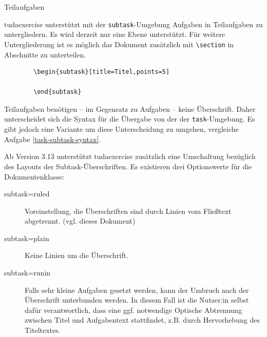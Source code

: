 \documentclass[
	ngerman,
	points=true,%
	]{tudaexercise}
\let\code\texttt
\let\cls\textsf
\let\tbs\textbackslash
\begin{document}
\begin{task}{Teilaufgaben}
\begin{subtask}[title=Grundsturktur]
	\cls{tudaexercise} unterstützt mit der \code{subtask}-Umgebung Aufgaben in Teilaufgaben zu untergliedern. Es wird derzeit nur eine Ebene unterstützt. Für weitere Untergliederung ist es möglich das Dokument zusätzlich mit \code{\tbs{}section} in Abschnitte zu unterteilen. 
	
	\begin{verbatim}
		\begin{subtask}[title=Titel,points=5]
			
		\end{subtask}
	\end{verbatim}

	Teilaufgaben benötigen – im Gegensatz zu Aufgaben – keine Überschrift. Daher unterscheidet sich die Syntax für die Übergabe von der der \code{task}-Umgebung. Es gibt jedoch eine Variante um diese Unterscheidung zu umgehen, vergleiche Aufgabe \ref{task-subtask-syntax}.
\end{subtask}

\begin{subtask}[title=Anpassung der Überschriften]
	Ab Version 3.13 unterstützt \cls{tudaexercise} zusätzlich eine Umschaltung bezüglich des Layouts der Subtask-Überschriften. Es existieren drei Optionswerte für die Dokumentenklasse:
	\begin{description}
		\item[subtask=ruled] Voreinstellung, die Überschriften sind durch Linien vom Fließtext abgetrennt. (vgl. dieses Dokument)
		\item[subtask=plain] Keine Linien um die Überschrift.
		\item[subtask=runin] Falls sehr kleine Aufgaben gesetzt werden, kann der Umbruch nach der Überschrift unterbunden werden. In diesem Fall ist die Nutzer:in selbst dafür verantwortlich, dass eine ggf. notwendige Optische Abtrennung zwischen Titel und Aufgabentext stattfindet, z.B. durch Hervorhebung des Titeltextes.
	\end{description}
\end{subtask}
\end{task}
\end{document}
